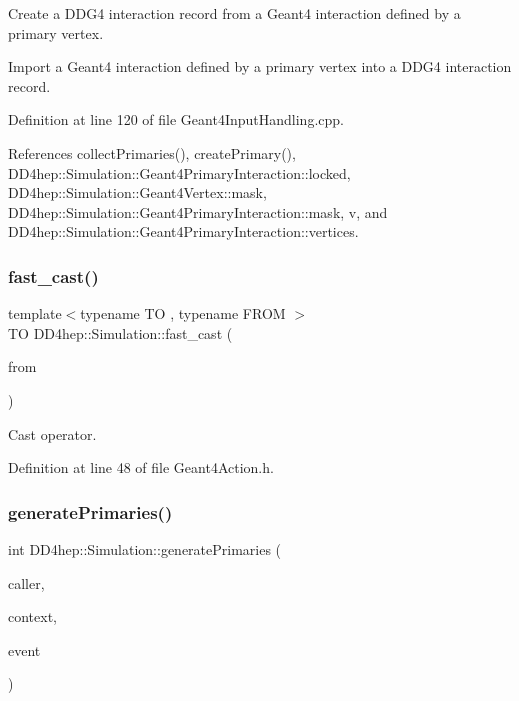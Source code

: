 Create a D\+D\+G4 interaction record from a Geant4 interaction defined by a primary vertex. 

Import a Geant4 interaction defined by a primary vertex into a D\+D\+G4 interaction record. 

Definition at line 120 of file Geant4\+Input\+Handling.\+cpp.



References collect\+Primaries(), create\+Primary(), D\+D4hep\+::\+Simulation\+::\+Geant4\+Primary\+Interaction\+::locked, D\+D4hep\+::\+Simulation\+::\+Geant4\+Vertex\+::mask, D\+D4hep\+::\+Simulation\+::\+Geant4\+Primary\+Interaction\+::mask, v, and D\+D4hep\+::\+Simulation\+::\+Geant4\+Primary\+Interaction\+::vertices.

\hypertarget{namespace_d_d4hep_1_1_simulation_a335c0c2dda54e31d3526712b906bb0bb}{}\label{namespace_d_d4hep_1_1_simulation_a335c0c2dda54e31d3526712b906bb0bb} 
\subsubsection{\texorpdfstring{fast\+\_\+cast()}{fast\_cast()}}
{\footnotesize\ttfamily template$<$typename TO , typename F\+R\+OM $>$ \\
TO D\+D4hep\+::\+Simulation\+::fast\+\_\+cast (\begin{DoxyParamCaption}\item[{F\+R\+OM}]{from }\end{DoxyParamCaption})}



Cast operator. 



Definition at line 48 of file Geant4\+Action.\+h.

\hypertarget{namespace_d_d4hep_1_1_simulation_af9101fceaeec2ab63e17c360a22638cd}{}\label{namespace_d_d4hep_1_1_simulation_af9101fceaeec2ab63e17c360a22638cd} 
\subsubsection{\texorpdfstring{generate\+Primaries()}{generatePrimaries()}}
{\footnotesize\ttfamily int D\+D4hep\+::\+Simulation\+::generate\+Primaries (\begin{DoxyParamCaption}\item[{const \hyperlink{class_d_d4hep_1_1_simulation_1_1_geant4_action}{Geant4\+Action} $\ast$}]{caller,  }\item[{const \hyperlink{class_d_d4hep_1_1_simulation_1_1_geant4_context}{Geant4\+Context} $\ast$}]{context,  }\item[{G4\+Event $\ast$}]{event }\end{DoxyParamCaption})}



